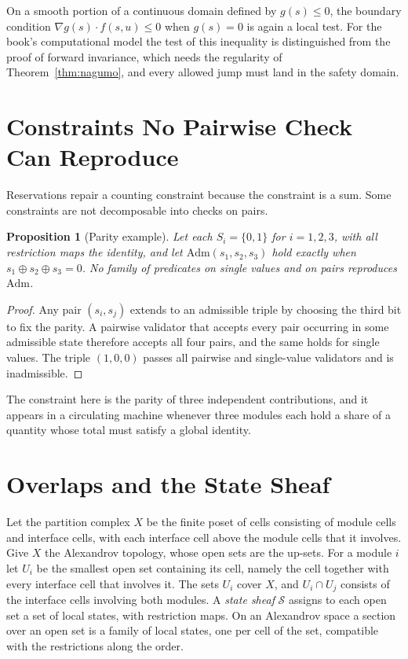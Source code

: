 \documentclass[11pt,openany]{book}
\theoremstyle{plain}
\newtheorem{proposition}[theorem]{Proposition}
\theoremstyle{definition}
\theoremstyle{remark}
\begin{document}
On a smooth portion of a continuous domain defined by $g(s)\le0$, the boundary condition $\nabla g(s)\cdot f(s,u)\le0$ when $g(s)=0$ is again a local test. For the book's computational model the test of this inequality is distinguished from the proof of forward invariance, which needs the regularity of Theorem~\ref{thm:nagumo}, and every allowed jump must land in the safety domain.

\section{Constraints No Pairwise Check Can Reproduce}

Reservations repair a counting constraint because the constraint is a sum. Some constraints are not decomposable into checks on pairs.

\begin{proposition}[Parity example]
\label{prop:parity}
Let each $S_i=\{0,1\}$ for $i=1,2,3$, with all restriction maps the identity, and let $\mathrm{Adm}(s_1,s_2,s_3)$ hold exactly when $s_1\oplus s_2\oplus s_3=0$. No family of predicates on single values and on pairs reproduces $\mathrm{Adm}$.
\end{proposition}
\begin{proof}
Any pair $(s_i,s_j)$ extends to an admissible triple by choosing the third bit to fix the parity. A pairwise validator that accepts every pair occurring in some admissible state therefore accepts all four pairs, and the same holds for single values. The triple $(1,0,0)$ passes all pairwise and single-value validators and is inadmissible.
\end{proof}

The constraint here is the parity of three independent contributions, and it appears in a circulating machine whenever three modules each hold a share of a quantity whose total must satisfy a global identity.

\section{Overlaps and the State Sheaf}

Let the partition complex $X$ be the finite poset of cells consisting of module cells and interface cells, with each interface cell above the module cells that it involves. Give $X$ the Alexandrov topology, whose open sets are the up-sets. For a module $i$ let $U_i$ be the smallest open set containing its cell, namely the cell together with every interface cell that involves it. The sets $U_i$ cover $X$, and $U_i\cap U_j$ consists of the interface cells involving both modules. A \emph{state sheaf} $\mathcal S$ assigns to each open set a set of local states, with restriction maps. On an Alexandrov space a section over an open set is a family of local states, one per cell of the set, compatible with the restrictions along the order.
\end{document}
